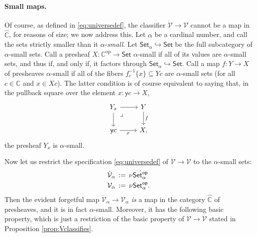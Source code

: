 \documentclass[11pt]{amsart}
\newcommand{\C}{\ensuremath{\boxempty}}
\newcommand{\bbC}{\ensuremath{\mathbb{C}}}
\newcommand{\Set}{\ensuremath{\mathsf{Set}}}
\newcommand{\y}{\ensuremath{\mathsf{y}}} %
\newcommand{\op}[1]{\ensuremath{{#1}^{\mathrm{op}}}}
\newcommand{\hook}{\ensuremath{\hookrightarrow}}
\renewcommand{\to}{\ensuremath{\rightarrow}}
\newcommand{\V}{\ensuremath{\mathcal{V}}}
\newcommand{\VV}{\ensuremath{\dot{\mathcal{V}}}}
\newcommand{\SSet}{\ensuremath{\,\dot{\Set}}}
\theoremstyle{remark}
\theoremstyle{definition}
\newcommand{\pbmark}{\ar[dr, phantom, "\lrcorner" very near start, shift right=.5ex]}	%
\begin{document}
\paragraph{Small maps.}
 
Of course, as defined in \eqref{eq:universedef}, the classifier $\VV\to\V$ cannot be a map in $\widehat{\bbC}$, for reasons of size; we now address this.  
Let $\alpha$ be a cardinal number, and call the sets strictly smaller than it $\alpha$-\emph{small}.  Let $\Set_\alpha\hook\Set$ be the full subcategory of $\alpha$-small sets.  
Call a presheaf $X : \op{\bbC} \to \Set$ $\alpha$-small if all of its values are $\alpha$-small sets, and thus if, and only if, it factors through $\Set_\alpha\hook\Set$. Call a map $f:Y\to X$ of presheaves $\alpha$-small if all of the fibers $f_c^{-1}\{ x\} \subseteq Yc$ are $\alpha$-small sets (for all $c\in\bbC$ and $x\in Xc$). The latter condition is of course equivalent to saying that, in the pullback square over the element $x:\y{c} \to X$, 
\begin{equation}\label{eq:smallmap}\textstyle
\begin{tikzcd}
	 Y_x \ar[d] \pbmark \ar[r] & Y \ar[d, "f"] \\  
	\y{c} \ar[r,swap,"x"] &  X,
 \end{tikzcd}
 \end{equation}
the presheaf $Y_x$ is $\alpha$-small.


Now let us restrict the specification \eqref{eq:universedef} of $\VV\to\V$ to the $\alpha$-small sets:
\begin{align}\label{eq:universedefalpha}\textstyle
\VV_\alpha\, &:=\, \nu \dot{\Set^{\mathsf{op}}_\alpha}\\  
\V_\alpha\, &:=\, \nu \Set^{\mathsf{op}}_\alpha. \notag
 \end{align}
Then the evident forgetful map $\VV_\alpha\to\V_\alpha$ \emph{is} a map in the category $\widehat{\bbC}$ of presheaves, and it is in fact $\alpha$-small. Moreover, it has the following basic property, which is just a restriction of the basic property of $\VV\to\V$ stated in Proposition \ref{prop:Vclassifies}.
\end{document}
